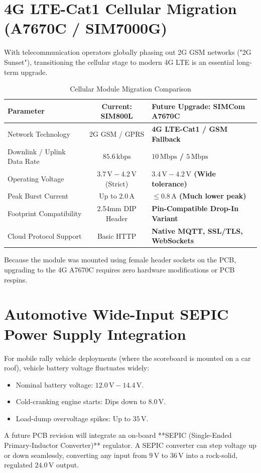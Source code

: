 \documentclass[12pt,a4paper,oneside]{report}
\begin{document}
\section{4G LTE-Cat1 Cellular Migration (A7670C / SIM7000G)}
With telecommunication operators globally phasing out 2G GSM networks ("2G Sunset"), transitioning the cellular stage to modern 4G LTE is an essential long-term upgrade.

\begin{table}[H]
\centering
\small
\caption{Cellular Module Migration Comparison}
\label{tab:gsm_upgrade}
\begin{tabularx}{\textwidth}{>{\raggedright\arraybackslash}X c >{\raggedright\arraybackslash}p{4.5cm}}
\toprule
\textbf{Parameter} & \textbf{Current: SIM800L} & \textbf{Future Upgrade: SIMCom A7670C} \\
\midrule
Network Technology & 2G GSM / GPRS & \textbf{4G LTE-Cat1 / GSM Fallback} \\
Downlink / Uplink Data Rate & $85.6\,\text{kbps}$ & \textbf{$10\,\text{Mbps}$ / $5\,\text{Mbps}$} \\
Operating Voltage & $3.7\,\text{V} - 4.2\,\text{V}$ (Strict) & \textbf{$3.4\,\text{V} - 4.2\,\text{V}$ (Wide tolerance)} \\
Peak Burst Current & Up to $2.0\,\text{A}$ & \textbf{$\le 0.8\,\text{A}$ (Much lower peak)} \\
Footprint Compatibility & 2.54mm DIP Header & \textbf{Pin-Compatible Drop-In Variant} \\
Cloud Protocol Support & Basic HTTP & \textbf{Native MQTT, SSL/TLS, WebSockets} \\
\bottomrule
\end{tabularx}
\end{table}

\noindent Because the module was mounted using female header sockets on the PCB, upgrading to the 4G A7670C requires zero hardware modifications or PCB respins.

\section{Automotive Wide-Input SEPIC Power Supply Integration}
For mobile rally vehicle deployments (where the scoreboard is mounted on a car roof), vehicle battery voltage fluctuates widely:
\begin{itemize}
    \item Nominal battery voltage: $12.0\,\text{V} - 14.4\,\text{V}$.
    \item Cold-cranking engine starts: Dips down to $8.0\,\text{V}$.
    \item Load-dump overvoltage spikes: Up to $35\,\text{V}$.
\end{itemize}
A future PCB revision will integrate an on-board **SEPIC (Single-Ended Primary-Inductor Converter)** regulator. A SEPIC converter can step voltage up or down seamlessly, converting any input from $9\,\text{V}$ to $36\,\text{V}$ into a rock-solid, regulated $24.0\,\text{V}$ output.
\end{document}
